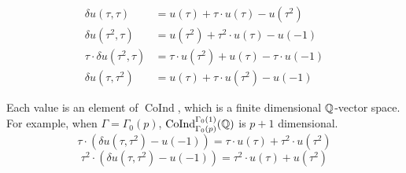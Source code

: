 \documentclass[12pt]{article}
\theoremstyle{definition}
\def\Q{{\Bbb Q}}
\def\CoInd{\operatorname{CoInd}}
\begin{document}
\begin{align*}
\delta u (\tau,\tau) & = u(\tau) +\tau\cdot u(\tau) - u(\tau^2)\\
\delta u(\tau^2,\tau) & = u(\tau^2) +\tau^2\cdot u(\tau) - u(-1)\\
\tau\cdot \delta u(\tau^2,\tau) &= \tau\cdot u(\tau^2) + u(\tau) -\tau\cdot u(-1)\\
\delta u(\tau,\tau^2) & = u(\tau)+\tau\cdot u(\tau^2)- u(-1)
\end{align*}

Each value is an element of $\CoInd$, which is a finite dimensional $\Q$-vector space. For example, when $\Gamma=\Gamma_0(p)$, $\CoInd^{\Gamma_0(1)}_{\Gamma_0(p)}(\Q)$ is $p+1$ dimensional. 
$$\tau\cdot( \delta u(\tau,\tau^2) -u(-1)) = \tau\cdot u(\tau)+\tau^2 \cdot u(\tau^2)$$
$$\tau^{2} \cdot(\delta u(\tau,\tau^2) - u(-1)) =  \tau^{2}\cdot u(\tau) +u(\tau^2)$$
\end{document}
